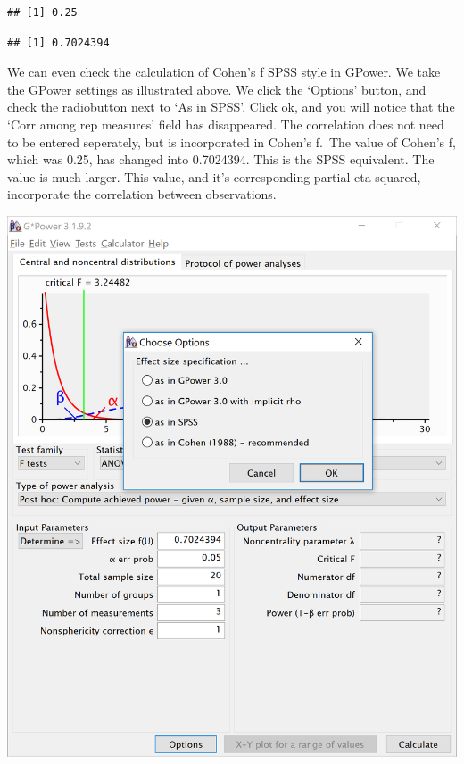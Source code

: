 \documentclass[]{book}
\newenvironment{Shaded}{\begin{snugshade}}{\end{snugshade}}
\newcommand{\KeywordTok}[1]{\textcolor[rgb]{0.13,0.29,0.53}{\textbf{#1}}}
\newcommand{\NormalTok}[1]{#1}
\newcommand{\OperatorTok}[1]{\textcolor[rgb]{0.81,0.36,0.00}{\textbf{#1}}}
\begin{document}
\begin{Shaded}
\end{Shaded}

\begin{verbatim}
## [1] 0.25
\end{verbatim}

\begin{Shaded}
\end{Shaded}

\begin{verbatim}
## [1] 0.7024394
\end{verbatim}

We can even check the calculation of Cohen's f SPSS style in GPower. We take the GPower settings as illustrated above. We click the `Options' button, and check the radiobutton next to `As in SPSS'. Click ok, and you will notice that the `Corr among rep measures' field has disappeared. The correlation does not need to be entered seperately, but is incorporated in Cohen's f.~The value of Cohen's f, which was 0.25, has changed into 0.7024394. This is the SPSS equivalent. The value is much larger. This value, and it's corresponding partial eta-squared, incorporate the correlation between observations.

\includegraphics{screenshots/gpower_14.png}
\end{document}

